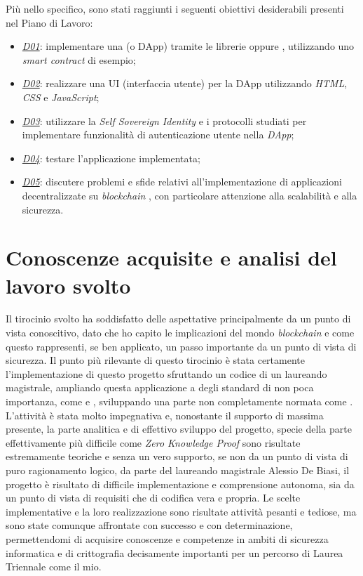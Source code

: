 Più nello specifico, sono stati raggiunti i seguenti obiettivi desiderabili presenti nel Piano di Lavoro:
\begin{itemize}
    \item \underline{\textit{D01}}: implementare una  (o DApp) tramite le librerie  oppure , utilizzando uno \textit{smart contract} di esempio;
    \item \underline{\textit{D02}}: realizzare una UI (interfaccia utente) per la DApp utilizzando \textit{HTML}, \textit{CSS} e \textit{JavaScript};
    \item \underline{\textit{D03}}: utilizzare la \textit{Self Sovereign Identity} e i protocolli studiati per implementare funzionalità di autenticazione utente nella \textit{DApp};
    \item \underline{\textit{D04}}: testare l'applicazione implementata;
    \item \underline{\textit{D05}}: discutere problemi e sfide relativi all'implementazione di applicazioni decentralizzate su \textit{blockchain} , con particolare attenzione alla scalabilità e alla sicurezza.
\end{itemize}

\section{Conoscenze acquisite e analisi del lavoro svolto}\label{sec:conclusioni-conoscenze-lavoro}

Il tirocinio svolto ha soddisfatto delle aspettative principalmente da un punto di vista conoscitivo, dato che ho capito le implicazioni del mondo \textit{blockchain} e come questo rappresenti,
se ben applicato, un passo importante da un punto di vista di sicurezza. 
Il punto più rilevante di questo tirocinio è stata certamente l'implementazione di questo progetto sfruttando un codice di un laureando magistrale, ampliando questa applicazione a degli standard 
di non poca importanza, come  e , sviluppando una parte non completamente normata come . \\

L'attività è stata molto impegnativa e, nonostante il supporto di massima presente, la parte analitica e di effettivo sviluppo del progetto, specie della parte effettivamente più difficile come 
\textit{Zero Knowledge Proof} sono risultate estremamente teoriche e senza un vero supporto, se non da un punto di vista di puro ragionamento logico, da parte del laureando magistrale Alessio De Biasi, 
il progetto è risultato di difficile implementazione e comprensione autonoma, sia da un punto di vista di requisiti che di codifica vera e propria. Le scelte implementative e la loro realizzazione sono risultate attività pesanti e tediose, 
ma sono state comunque affrontate con successo e con determinazione, permettendomi di acquisire conoscenze e competenze in ambiti di sicurezza informatica e di crittografia decisamente importanti per un percorso di Laurea Triennale come il mio. \\

